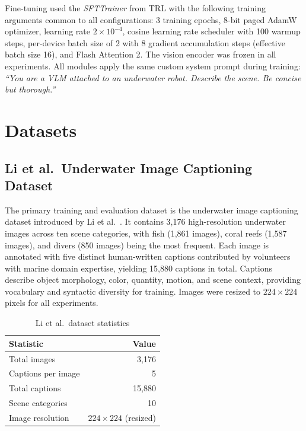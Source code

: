 Fine-tuning used the \textit{SFTTrainer} from TRL with the following training arguments common to all configurations: 3 training epochs, 8-bit paged AdamW optimizer, learning rate $2 \times 10^{-4}$, cosine learning rate scheduler with 100 warmup steps, per-device batch size of 2 with 8 gradient accumulation steps (effective batch size 16), and Flash Attention 2. The vision encoder was frozen in all experiments. All modules apply the same custom system prompt during training: \textit{``You are a VLM attached to an underwater robot. Describe the scene. Be concise but thorough.''}


\chapter{Datasets} \label{app:datasets}

\section{Li et al.\ Underwater Image Captioning Dataset}

The primary training and evaluation dataset is the underwater image captioning dataset introduced by Li et al.~\cite{mainref}. It contains 3,176 high-resolution underwater images across ten scene categories, with fish (1,861 images), coral reefs (1,587 images), and divers (850 images) being the most frequent. Each image is annotated with five distinct human-written captions contributed by volunteers with marine domain expertise, yielding 15,880 captions in total. Captions describe object morphology, color, quantity, motion, and scene context, providing vocabulary and syntactic diversity for training. Images were resized to $224 \times 224$ pixels for all experiments.

\begin{table}[h!]
\centering
\caption{Li et al.\ dataset statistics}
\label{tab:dataset_stats}
\begin{tabular}{lr}
\hline
\textbf{Statistic} & \textbf{Value} \\
\hline
Total images         & 3,176 \\
Captions per image   & 5 \\
Total captions       & 15,880 \\
Scene categories     & 10 \\
Image resolution     & $224 \times 224$ (resized) \\
\hline
\end{tabular}
\end{table}

